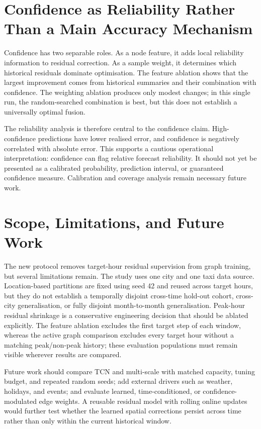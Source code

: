 \documentclass[12pt,a4paper]{report}
\begin{document}
	\section{Confidence as Reliability Rather Than a Main Accuracy Mechanism}
	
Confidence has two separable roles. As a node feature, it adds local reliability information to residual correction. As a sample weight, it determines which historical residuals dominate optimisation. The feature ablation shows that the largest improvement comes from historical summaries and their combination with confidence. The weighting ablation produces only modest changes; in this single run, the random-searched combination is best, but this does not establish a universally optimal fusion.
	
	The reliability analysis is therefore central to the confidence claim. High-confidence predictions have lower realised error, and confidence is negatively correlated with absolute error. This supports a cautious operational interpretation: confidence can flag relative forecast reliability. It should not yet be presented as a calibrated probability, prediction interval, or guaranteed confidence measure. Calibration and coverage analysis remain necessary future work.
	
	\section{Scope, Limitations, and Future Work}
	
The new protocol removes target-hour residual supervision from graph training, but several limitations remain. The study uses one city and one taxi data source. Location-based partitions are fixed using seed 42 and reused across target hours, but they do not establish a temporally disjoint cross-time hold-out cohort, cross-city generalisation, or fully disjoint month-to-month generalisation. Peak-hour residual shrinkage is a conservative engineering decision that should be ablated explicitly. The feature ablation excludes the first target step of each window, whereas the active graph comparison excludes every target hour without a matching peak/non-peak history; these evaluation populations must remain visible wherever results are compared.
	
Future work should compare TCN and multi-scale with matched capacity, tuning budget, and repeated random seeds; add external drivers such as weather, holidays, and events; and evaluate learned, time-conditioned, or confidence-modulated edge weights. A reusable residual model with rolling online updates would further test whether the learned spatial corrections persist across time rather than only within the current historical window.
	
\end{document}
